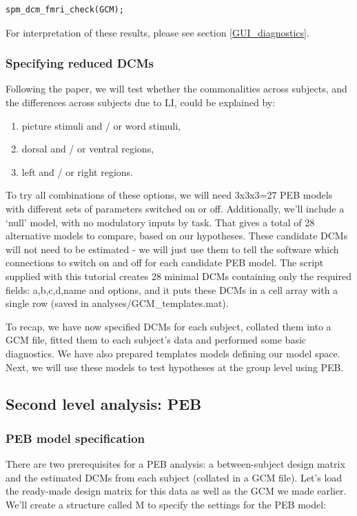 \documentclass{article}
\begin{document}
\begin{lstlisting}[style=Matlab-editor, caption=DCM for fMRI diagnostics]
spm_dcm_fmri_check(GCM);
\end{lstlisting}

For interpretation of these results, please see section \ref{GUI_diagnostics}.

\subsubsection{Specifying reduced DCMs}
Following the paper, we will test whether the commonalities across subjects, and the differences across subjects due to LI, could be explained by:

\begin{enumerate}
    \item picture stimuli and / or word stimuli,
    \item dorsal and / or ventral regions,
    \item left and / or right regions.
\end{enumerate}

To try all combinations of these options, we will need 3x3x3=27 PEB  models with different sets of parameters switched on or off. Additionally, we'll include a `null' model, with no modulatory inputs by task. That gives a total of 28 alternative models to compare, based on our hypotheses. These candidate DCMs will not need to be estimated - we will just use them to tell the software which connections to switch on and off for each candidate PEB model. The script supplied with this tutorial creates 28 minimal DCMs containing only the required fields: a,b,c,d,name and options, and it puts these DCMs in a cell array with a single row (saved in analyses/GCM\_templates.mat).

To recap, we have now specified DCMs for each subject, collated them into a GCM file, fitted them to each subject's data and performed some basic diagnostics. We have also prepared templates models defining our model space. Next, we will use these models to test hypotheses at the group level using PEB.

\subsection{Second level analysis: PEB}

\subsubsection{PEB model specification}
There are two prerequisites for a PEB analysis: a between-subject design matrix and the estimated DCMs from each subject (collated in a GCM file). Let's load the ready-made design matrix for this data as well as the GCM we made earlier. We'll create a structure called M to specify the settings for the PEB model:
\end{document}
